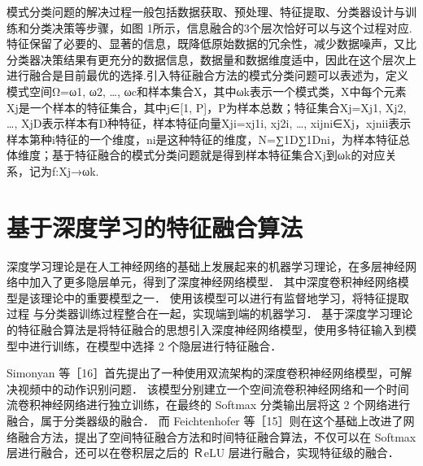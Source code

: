 模式分类问题的解决过程一般包括数据获取、预处理、特征提取、分类器设计与训练和分类决策等步骤，如图 1所示，信息融合的3个层次恰好可以与这个过程对应.特征保留了必要的、显著的信息，既降低原始数据的冗余性，减少数据噪声，又比分类器决策结果有更充分的数据信息，数据量和数据维度适中，因此在这个层次上进行融合是目前最优的选择.引入特征融合方法的模式分类问题可以表述为，定义模式空间Ω={ω1, ω2, …, ωc}和样本集合X，其中ωk表示一个模式类，X中每个元素Xj是一个样本的特征集合，其中j∈[1, P]，P为样本总数；特征集合Xj={Xj1, Xj2, …, XjD}表示样本有D种特征，样本特征向量Xji={xj1i, xj2i, …, xijni}∈Xj，xjnii表示样本第种i特征的一个维度，ni是这种特征的维度，N=∑1D∑1Dni，为样本特征总体维度；基于特征融合的模式分类问题就是得到样本特征集合Xj到ωk的对应关系，记为f:Xj→ωk.

\section{基于深度学习的特征融合算法}
深度学习理论是在人工神经网络的基础上发展起来的机器学习理论，在多层神经网络中加入了更多隐层单元，得到了深度神经网络模型． 其中深度卷积神经网络模型是该理论中的重要模型之一． 使用该模型可以进行有监督地学习，将特征提取过程
与分类器训练过程整合在一起，实现端到端的机器学习． 基于深度学习理论的特征融合算法是将特征融合的思想引入深度神经网络模型，使用多特征输入到模型中进行训练，在模型中选择 2 个隐层进行特征融合．

Simonyan 等［16］首先提出了一种使用双流架构的深度卷积神经网络模型，可解决视频中的动作识别问题． 该模型分别建立一个空间流卷积神经网络和一个时间流卷积神经网络进行独立训练，在最终的 Softmax 分类输出层将这 2 个网络进行融合，属于分类器级的融合． 而 Feichtenhofer 等［15］则在这个基础上改进了网络融合方法，提出了空间特征融合方法和时间特征融合算法，不仅可以在 Softmax 层进行融合，还可以在卷积层之后的 ＲeLU 层进行融合，实现特征级的融合．
